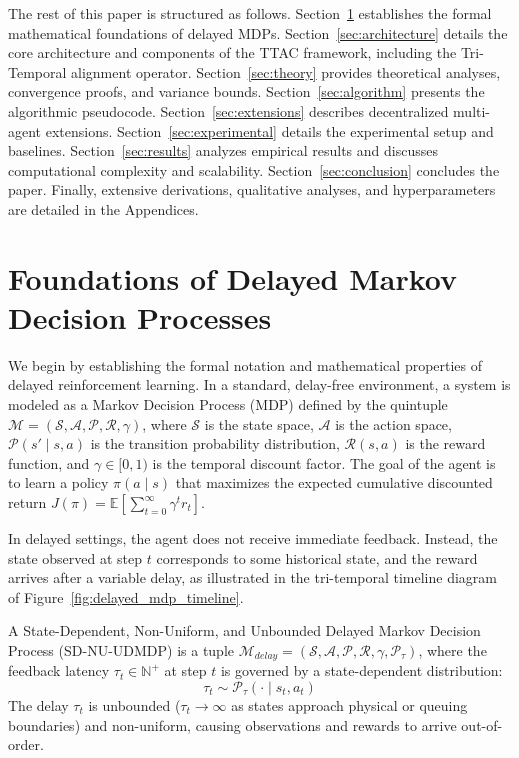 \documentclass[manuscript, screen, review]{jair}
\begin{document}
The rest of this paper is structured as follows. Section~\ref{sec:foundations} establishes the formal mathematical foundations of delayed MDPs. Section~\ref{sec:architecture} details the core architecture and components of the TTAC framework, including the Tri-Temporal alignment operator. Section~\ref{sec:theory} provides theoretical analyses, convergence proofs, and variance bounds. Section~\ref{sec:algorithm} presents the algorithmic pseudocode. Section~\ref{sec:extensions} describes decentralized multi-agent extensions. Section~\ref{sec:experimental} details the experimental setup and baselines. Section~\ref{sec:results} analyzes empirical results and discusses computational complexity and scalability. Section~\ref{sec:conclusion} concludes the paper. Finally, extensive derivations, qualitative analyses, and hyperparameters are detailed in the Appendices.

\section{Foundations of Delayed Markov Decision Processes}\label{sec:foundations}
We begin by establishing the formal notation and mathematical properties of delayed reinforcement learning. In a standard, delay-free environment, a system is modeled as a Markov Decision Process (MDP) defined by the quintuple $\mathcal{M} = (\mathcal{S}, \mathcal{A}, \mathcal{P}, \mathcal{R}, \gamma)$, where $\mathcal{S}$ is the state space, $\mathcal{A}$ is the action space, $\mathcal{P}(s' \mid s, a)$ is the transition probability distribution, $\mathcal{R}(s, a)$ is the reward function, and $\gamma \in [0, 1)$ is the temporal discount factor. The goal of the agent is to learn a policy $\pi(a \mid s)$ that maximizes the expected cumulative discounted return $J(\pi) = \mathbb{E} \left[ \sum_{t=0}^{\infty} \gamma^t r_t \right]$.

In delayed settings, the agent does not receive immediate feedback. Instead, the state observed at step $t$ corresponds to some historical state, and the reward arrives after a variable delay, as illustrated in the tri-temporal timeline diagram of Figure~\ref{fig:delayed_mdp_timeline}.

\begin{definition}
A State-Dependent, Non-Uniform, and Unbounded Delayed Markov Decision Process (SD-NU-UDMDP) is a tuple $\mathcal{M}_{delay} = (\mathcal{S}, \mathcal{A}, \mathcal{P}, \mathcal{R}, \gamma, \mathcal{P}_\tau)$, where the feedback latency $\tau_t \in \mathbb{N}^+$ at step $t$ is governed by a state-dependent distribution:
\begin{equation}
    \tau_t \sim \mathcal{P}_\tau(\cdot \mid s_t, a_t)
\end{equation}
The delay $\tau_t$ is unbounded ($\tau_t \to \infty$ as states approach physical or queuing boundaries) and non-uniform, causing observations and rewards to arrive out-of-order.
\end{definition}
\end{document}
